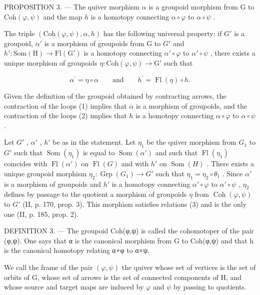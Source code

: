 PROPOSITION 3. --- The quiver morphism \(\alpha\) is a groupoid morphism from G to \(\mathrm{Coh}(\varphi, \psi)\) and the map \(h\) is a homotopy connecting \(\alpha \circ \varphi\) to \(\alpha \circ \psi\) .

The triple \((\mathrm{Coh}(\varphi,\psi),\alpha,h)\) has the following universal property: if \(G'\) is a groupoid, \(\alpha'\) is a morphism of groupoids from G to \(G'\) and \(h'\colon\mathrm{Som}(\mathrm{H})\to\mathrm{Fl}(\mathrm{G}')\) is a homotopy connecting \(\alpha'\circ\varphi\) to \(\alpha'\circ\psi\) , there exists a unique morphism of groupoids \(\eta\colon\mathrm{Coh}(\varphi,\psi)\to\mathrm{G}'\) such that

\[
\alpha^ {\prime} = \eta \circ \alpha \qquad\text{and}\qquad h ^ {\prime} = \operatorname{Fl} (\eta) \circ h.\tag{3}
\]

Given the definition of the groupoid obtained by contracting arrows, the contraction of the loops (1) implies that \(\alpha\) is a morphism of groupoids, and the contraction of the loops (2) implies that \(h\) is a homotopy connecting \(\alpha \circ \varphi\) to \(\alpha \circ \psi\) .

Let \(G'\) , \(\alpha'\) , \(h'\) be as in the statement. Let \(\eta_{1}\) be the quiver morphism from \(G_{1}\) to \(G'\) such that \(\operatorname{Som}(\eta_{1})\) is equal to \(\operatorname{Som}(\alpha')\) and such that \(\operatorname{Fl}(\eta_{1})\) coincides with \(\operatorname{Fl}(\alpha')\) on \(\operatorname{Fl}(G)\) and with \(h'\) on \(\operatorname{Som}(H)\) . There exists a unique groupoid morphism \(\eta_{2}: \operatorname{Grp}(G_{1}) \to G'\) such that \(\eta_{1} = \eta_{2} \circ \theta_{1}\) . Since \(\alpha'\) is a morphism of groupoids and \(h'\) is a homotopy connecting \(\alpha' \circ \varphi\) to \(\alpha' \circ \psi\) , \(\eta_{2}\) defines by passage to the quotient a morphism of groupoids \(\eta\) from \(\operatorname{Coh}(\varphi, \psi)\) to \(G'\) (II, p. 170, prop. 3). This morphism satisfies relations (3) and is the only one (II, p. 185, prop. 2).

DEFINITION 3. --- The groupoid Coh(φ,ψ) is called the cohomotoper of the pair (φ,ψ). One says that α is the canonical morphism from G to Coh(φ,ψ) and that h is the canonical homotopy relating α∘φ to α∘ψ.

We call the frame of the pair \((\varphi,\psi)\) the quiver whose set of vertices is the set of orbits of G, whose set of arrows is the set of connected components of H, and whose source and target maps are induced by \(\varphi\) and \(\psi\) by passing to quotients.

